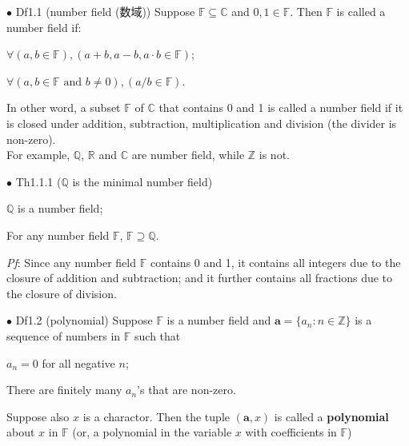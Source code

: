\documentclass{article}
\begin{document}
\begin{Df}{$\bullet$ Df1.1 (number field (数域))}
    Suppose $\mathbb{F}\subseteq\mathbb{C}$ and $0,1\in\mathbb{F}$. Then $\mathbb{F}$ is called a number field if:
    \begin{compactenum}
        \item $\forall (a,b\in \mathbb{F}), (a+b, a-b, a\cdot b \in \mathbb{F})$;
        \item $\forall (a,b\in \mathbb{F} \text{ and } b\neq 0), (a/b\in \mathbb{F})$.
    \end{compactenum}
\end{Df}

\begin{Rmk}{}
    In other word, a subset $\mathbb{F}$ of $\mathbb{C}$ that contains 0 and 1 is called a number field if it is closed under addition, subtraction, multiplication and division (the divider is non-zero).\\
    \textcolor{Th}{For example, $\mathbb{Q}$, $\mathbb{R}$ and $\mathbb{C}$ are number field, while $\mathbb{Z}$ is not.}
\end{Rmk}

\begin{Th}{$\bullet$ Th1.1.1 ($\mathbb{Q}$ is the minimal number field)}
    \begin{compactenum}
        \item $\mathbb{Q}$ is a number field;
        \item For any number field $\mathbb{F}$, $\mathbb{F}\supseteq\mathbb{Q}$.
    \end{compactenum}
    \tcblower
    \textit{Pf}: Since any number field $\mathbb{F}$ contains 0 and 1, it contains all integers due to the closure of addition and subtraction; and it further contains all fractions due to the closure of division.
\end{Th}

\begin{Df}{$\bullet$ Df1.2 (polynomial)}
    Suppose $\mathbb{F}$ is a number field and $\pmb{a} = \{a_n: n\in\mathbb{Z}\}$ is a sequence of numbers in $\mathbb{F}$ such that
    \begin{compactenum}
        \item $a_n = 0$ for all negative $n$;
        \item There are finitely many $a_n$'s that are non-zero.
    \end{compactenum}
    Suppose also $x$ is a charactor. Then the tuple $(\pmb{a}, x)$ is called a \textbf{polynomial} about $x$ in $\mathbb{F}$ (or, a polynomial in the variable $x$ with coefficients in $\mathbb{F}$)
\end{Df}
\end{document}
